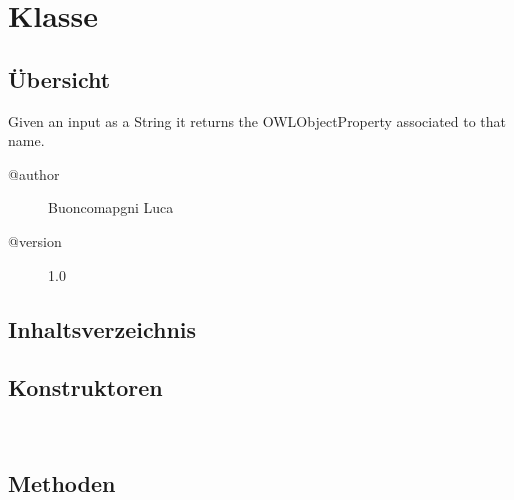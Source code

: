 
\section[AsOWLObjectProperty]{Klasse }\label{ontologyFramework.OFEventManagement.OFEventParameter.AsOWLObjectProperty-class}
\subsection{Übersicht}
Given an input as a String it returns the OWLObjectProperty associated to that name.
\begin{description}
\item[@author] 
Buoncomapgni Luca
\item[@version] 
1.0
\end{description}
\subsection{Inhaltsverzeichnis}
\subsection{Konstruktoren}
\begin{description}
\item[{\label{ontologyFramework.OFEventManagement.OFEventParameter.AsOWLObjectProperty()}}]
~ 
\end{description}
\subsection{Methoden}
\begin{description}
\item[{\label{ontologyFramework.OFEventManagement.OFEventParameter.AsOWLObjectProperty.getParameter(java.lang.Object,ontologyFramework.OFContextManagement.OWLReferences)}}]
~ 
\end{description}
